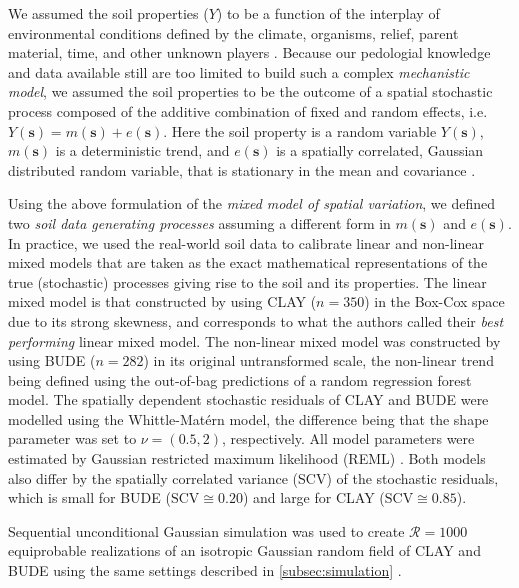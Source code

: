 We assumed the soil properties ($Y$) to be a function of the interplay of environmental conditions defined by 
the climate, organisms, relief, parent material, time, and other unknown players \cite{Jenny1941, 
McBratneyEtAl2003, Florinsky2012}. Because our pedologial knowledge and data available still are too limited 
to build such a complex \emph{mechanistic model}, we assumed the soil properties to be the outcome of a 
spatial stochastic process composed of the additive combination of fixed and random effects, i.e. 
$Y(\boldsymbol{s}) = m(\boldsymbol{s}) + e(\boldsymbol{s})$. Here the soil property is a random variable 
$Y(\boldsymbol{s})$, $m(\boldsymbol{s})$ is a deterministic trend, and $e(\boldsymbol{s})$ is a spatially 
correlated, Gaussian distributed random variable, that is stationary in the mean and covariance 
\cite{HeuvelinkEtAl2001}.

Using the above formulation of the \emph{mixed model of spatial variation}, we defined two \emph{soil 
data generating processes} assuming a different form in $m(\boldsymbol{s})$ and $e(\boldsymbol{s})$. In 
practice, we used the real-world soil data to calibrate linear and non-linear mixed models that are taken as 
the exact mathematical representations of the true (stochastic) processes giving rise to the soil and its 
properties. The linear mixed model is that constructed by \citet{Samuel-RosaEtAl2015} using CLAY ($n = 350$) 
in the Box-Cox space due to its strong skewness, and corresponds to what the authors called their \emph{best 
performing} linear mixed model. The non-linear mixed model was constructed by \citet{Samuel-RosaEtAl2016} 
using BUDE ($n = 282$) in its original untransformed scale, the non-linear trend being defined using the 
out-of-bag predictions of a random regression forest model. The spatially dependent stochastic residuals of 
CLAY and BUDE were modelled using the Whittle-Matérn model, the difference being that the shape parameter was 
set to $\nu = (0.5, 2)$, respectively. All model parameters were estimated by Gaussian restricted maximum 
likelihood (REML) \cite{LarkEtAl2004, DiggleEtAl2007}. Both models also differ by the spatially correlated 
variance (SCV) of the stochastic residuals, which is small for BUDE ($\text{SCV} \cong 0.20$) and large for 
CLAY ($\text{SCV} \cong 0.85$).

Sequential unconditional Gaussian simulation was used to create $\mathcal{R} = 1000$ equiprobable realizations 
of an isotropic Gaussian random field of CLAY and BUDE 
using the same settings described in \autoref{subsec:simulation} \cite{Samuel-RosaEtAl2016}.
 
